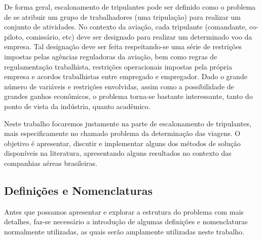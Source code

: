 \documentclass[12pt,a4paper]{article}
\begin{document}
De forma geral, escalonamento de tripulantes pode ser definido como o problema de se atribuir um
grupo de trabalhadores (uma tripulação) para realizar um conjunto de atividades. No contexto da
aviação, cada tripulante (comandante, co-piloto, comissário, etc) deve ser designado para realizar
um determinado voo da empresa. Tal designação deve ser feita respeitando-se uma série de restrições
impostas pelas agências reguladoras da aviação, bem como regras de regulamentação trabalhista,
restrições operacionais impostas pela própria empresa e acordos trabalhistas entre empregado e
empregador. Dado o grande número de variáveis e restrições envolvidas, assim como a possibilidade de
grandes ganhos econômicos, o problema torna-se bastante interessante, tanto do ponto de vista da
indústria, quanto acadêmico.

Neste trabalho focaremos justamente na parte de escalonamento de tripulantes, mais especificamente
no chamado problema da determinação das viagens. O objetivo é apresentar, discutir e implementar 
alguns dos métodos de solução disponíveis na literatura, apresentando alguns resultados no contexto
das companhias aéreas brasileiras.


\subsection{Definições e Nomenclaturas}
\label{sec:definicoes}

Antes que possamos apresentar e explorar a estrutura do problema com mais detalhes, faz-se
necessário a introdução de algumas definições e nomenclaturas normalmente utilizadas, as quais serão
amplamente utilizadas neste trabalho.
\end{document}
